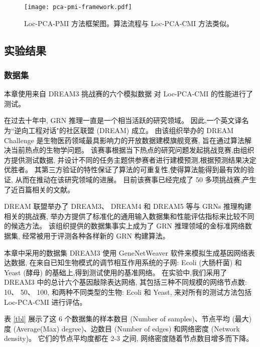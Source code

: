 \begin{figure}[!htbp]
  \centering
  \texttt{[image: pca-pmi-framework.pdf]}
  \caption{Loc-PCA-PMI 方法框架图。算法流程与 Loc-PCA-CMI 方法类似。}
  \label{pca-pmi-fr}
\end{figure}


\subsection{实验结果}

\subsubsection{数据集}
\label{subsubsec:loc-dataset}

本章使用来自 DREAM3 挑战赛的六个模拟数据  对 Loc-PCA-CMI 的性能进行了测试。

在过去十年中, GRN 推理一直是一个相当活跃的研究领域。
因此,一个英文译名为``逆向工程对话"的社区联盟 (DREAM)  成立。
由该组织举办的 DREAM Challenge 是生物医药领域最具影响力的开放数据建模旗舰竞赛,
旨在通过算法解决当前热点的生物学问题。
该赛事根据当下热点的研究问题发起挑战竞赛,由组织方提供测试数据,
并设计不同的任务主题供参赛者进行建模预测,根据预测结果决定优胜者。
其第三方验证的特性保证了算法的可重复性,使得算法能得到最有效的验证,
从而在推动在该研究领域的进展。
目前该赛事已经完成了 50 多项挑战赛,产生了近百篇相关的文献。

DREAM 联盟举办了 DREAM3、
DREAM4 和 DREAM5 等与 GRNs 推理构建相关的挑战赛, 
举办方提供了标准化的通用输入数据集和性能评估指标来比较不同的候选方法。
该组织提供的数据集事实上成为了 GRN 推理领域的金标准网络数据集,
经常被用于评测各种各样新的 GRN 构建算法。

本章中采用的数据集 DREAM3 使用 GeneNetWeaver 软件来模拟生成基因网络表达数据,
在来自已知生物模式的调节相互作用系统的子网:
 Ecoli (大肠杆菌) 和 Yeast (酵母) 的基础上,得到测试使用的基准网络。 
在实验中,我们采用了 DREAM3 中的总计六个基因敲除表达网络,
其包括三种不同规模的网络节点数: 10、 50、 100, 和两种不同类型的生物: Ecoli 和 Yeast, 
来对所有的测试方法包括 Loc-PCA-CMI 进行评估。

表 \ref{tbl} 展示了这 6 个数据集的样本数目 (Number of samples)、节点平均 (最大)度 (Average(Max) degree)、边数目 (Number of edges) 和网络密度 (Network density)。
它们的节点平均度都在 2-3 之间, 网络密度随着节点数目增多而下降。

